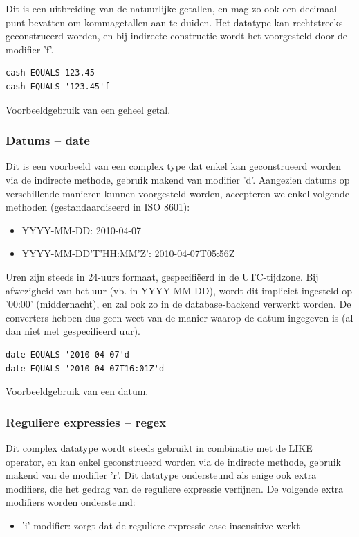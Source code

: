 Dit is een uitbreiding van de natuurlijke getallen, en mag zo ook een decimaal punt bevatten om kommagetallen aan te duiden. Het datatype kan rechtstreeks geconstrueerd worden, en bij indirecte constructie wordt het voorgesteld door de modifier 'f'.

\begin{code}
\begin{verbatim}
cash EQUALS 123.45
cash EQUALS '123.45'f
\end{verbatim}
\caption{Voorbeeldgebruik van een geheel getal.}
\end{code}

\subsubsection{Datums -- date}

Dit is een voorbeeld van een complex type dat enkel kan geconstrueerd worden via de indirecte methode, gebruik makend van modifier 'd'. Aangezien datums op verschillende manieren kunnen voorgesteld worden, accepteren we enkel volgende methoden (gestandaardiseerd in ISO 8601):
\begin{itemize}
\item{YYYY-MM-DD: 2010-04-07}
\item{YYYY-MM-DD'T'HH:MM'Z': 2010-04-07T05:56Z}
\end{itemize}

Uren zijn steeds in 24-uurs formaat, gespecifi\"eerd in de UTC-tijdzone. Bij afwezigheid van het uur (vb. in YYYY-MM-DD), wordt dit impliciet ingesteld op '00:00' (middernacht), en zal ook zo in de database-backend verwerkt worden. De converters hebben dus geen weet van de manier waarop de datum ingegeven is (al dan niet met gespecifieerd uur).

\begin{code}
\begin{verbatim}
date EQUALS '2010-04-07'd
date EQUALS '2010-04-07T16:01Z'd
\end{verbatim}
\caption{Voorbeeldgebruik van een datum.}
\end{code}

\subsubsection{Reguliere expressies -- regex}

Dit complex datatype wordt steeds gebruikt in combinatie met de LIKE operator, en kan enkel geconstrueerd worden via de indirecte methode, gebruik makend van de modifier 'r'. Dit datatype ondersteund als enige ook extra modifiers, die het gedrag van de reguliere expressie verfijnen. De volgende extra modifiers worden ondersteund:
\begin{itemize}
\item 'i' modifier: zorgt dat de reguliere expressie case-insensitive werkt
\end{itemize}

